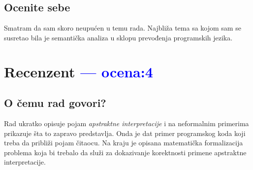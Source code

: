\documentclass[a4paper]{report}
\newcommand{\odgovor}[1]{\textcolor{blue}{#1}}
\begin{document}
\section{Ocenite sebe}

Smatram da sam skoro neupućen u temu rada. Najbliža tema sa kojom sam se susretao bila je semantička analiza u sklopu prevođenja programskih jezika.

\chapter{Recenzent \odgovor{--- ocena:4} }


\section{O čemu rad govori?}
Rad ukratko opisuje pojam \textit{apstraktne interpretacije} i na neformalnim primerima prikazuje šta to zapravo predstavlja. Onda je dat primer programskog koda koji treba da približi pojam čitaocu. Na kraju je opisana matematička formalizacija problema koja bi trebalo da služi za dokazivanje korektnosti primene apstraktne interpretacije.
\end{document}
